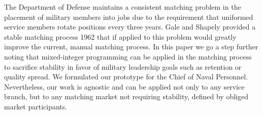 The Department of Defense maintains a consistent matching problem in the placement of military members into jobs due to the requirement that uniformed service members rotate positions every three years. Gale and Shapely provided a stable matching process 1962 that if applied to this problem would greatly improve the current, manual matching process. In this paper we go a step further noting that mixed-integer programming can be applied in the matching process to sacrifice stability in favor of military leadership goals such as retention or quality spread. We formulated our prototype for the Chief of Naval Personnel. Nevertheless, our work is agnostic and can be applied not only to any service branch, but to any matching market not requiring stability, defined by obliged market participants.  

